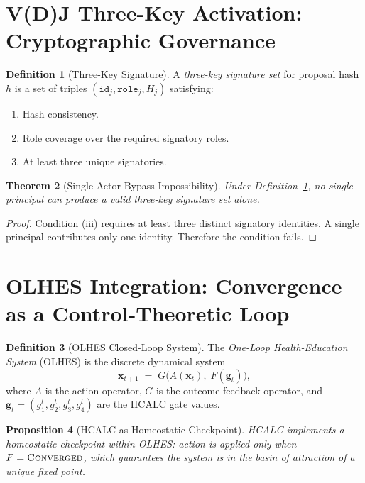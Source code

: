 \documentclass[11pt,a4paper]{article}
\theoremstyle{tealstyle}
\newtheorem{theorem}{Theorem}[section]
\newtheorem{proposition}[theorem]{Proposition}
\theoremstyle{definition}
\newtheorem{definition}[theorem]{Definition}
\newcommand{\F}{F}
\newcommand{\converged}{\textsc{Converged}}
\begin{document}
\section{V(D)J Three-Key Activation: Cryptographic Governance}
\label{sec:vdj}

\begin{definition}[Three-Key Signature]
\label{def:threekey}
A \emph{three-key signature set} for proposal hash $h$ is
a set of triples
$(\mathtt{id}_j, \mathtt{role}_j, H_j)$ satisfying:
\begin{enumerate}[label=(\roman*)]
  \item Hash consistency.
  \item Role coverage over the required signatory roles.
  \item At least three unique signatories.
\end{enumerate}
\end{definition}

\begin{theorem}[Single-Actor Bypass Impossibility]
\label{thm:bypass}
Under Definition~\ref{def:threekey}, no single principal can produce
a valid three-key signature set alone.
\end{theorem}

\begin{proof}
Condition (iii) requires at least three distinct signatory identities.
A single principal contributes only one identity.
Therefore the condition fails.
\end{proof}

\section{OLHES Integration: Convergence as a Control-Theoretic Loop}
\label{sec:olhes}

\begin{definition}[OLHES Closed-Loop System]
\label{def:olhes}
The \emph{One-Loop Health-Education System} (OLHES) is the discrete
dynamical system
\[
  \bm{x}_{t+1} \;=\; G\bigl(A(\bm{x}_t),\; \F(\bm{g}_t)\bigr),
\]
where $A$ is the action operator,
$G$ is the outcome-feedback operator, and
$\bm{g}_t = (g_1^t, g_2^t, g_3^t, g_4^t)$ are the HCALC gate values.
\end{definition}

\begin{proposition}[HCALC as Homeostatic Checkpoint]
\label{prop:homeostatic}
HCALC implements a homeostatic checkpoint within OLHES:
action is applied only when $\F = \converged$,
which guarantees the system is in the basin of attraction of a unique
fixed point.
\end{proposition}
\end{document}

